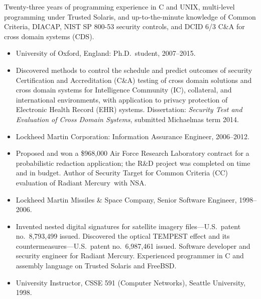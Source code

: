 \documentclass[12pt,twoside,letterpaper]{article}
\providecommand{\rmtrademark}{\raisebox{\height}{\tiny (TM)}}
\newenvironment{myquote}{\list{}{\leftmargin=0.15in\rightmargin=0in}\item[]}{\endlist}
\begin{document}
Twenty-three years of programming experience in C and UNIX, multi-level
programming under Trusted Solaris, and
up-to-the-minute knowledge of Common Criteria, DIACAP, NIST SP 800-53
security controls, and DCID 6/3 C\&A for cross domain systems (CDS).

\begin{itemize}
	\item University of Oxford, England: Ph.D.\ student, 2007--2015.
		\vspace{-2mm}
		\begin{myquote}
            Discovered methods to control the schedule and predict
            outcomes of security Certification and Accreditation (C\&A)
            testing of cross domain solutions and cross domain systems for
            Intelligence Community (IC), collateral, and international
            environments, with application to privacy protection
            of Electronic Health Record (EHR) systems. Dissertation:
            \emph{Security Test and Evaluation of Cross Domain Systems},
            submitted Michaelmas term 2014.
		\end{myquote}
\vspace{-2.5mm}
	\item Lockheed Martin Corporation: Information Assurance Engineer, 2006--2012.
		\vspace{-2mm}
		\begin{myquote}
            Proposed and won a \$968,000 Air Force Research Laboratory
            contract for a probabilistic redaction application; the
            R\&D project was completed on time and in budget. Author of
            Security Target for Common Criteria (CC) evaluation of Radiant
            Mercury\rmtrademark\ with NSA.
		\end{myquote}
\vspace{-2.5mm}
	\item Lockheed Martin Missiles \& Space Company, Senior Software Engineer, 1998--2006.
		\vspace{-2mm}
		\begin{myquote}
            Invented nested digital signatures for satellite imagery
            files---U.S.\ patent no.~8,793,499 issued. Discovered the
            optical TEMPEST effect and its countermeasures---U.S.\ patent
            no.~6,987,461 issued. Software developer and security engineer
            for Radiant Mercury\rmtrademark. Experienced programmer in C
            and assembly language on Trusted Solaris and FreeBSD.
		\end{myquote}
\vspace{-2.5mm}
	\item University Instructor, CSSE 591 (Computer Networks), Seattle University, 1998.
\end{itemize}
\end{document}
